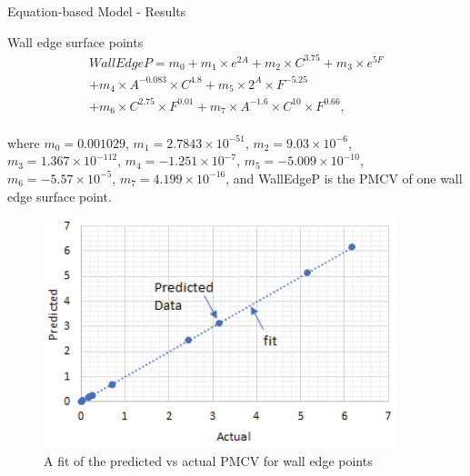 \documentclass{beamer}
\begin{document}
\begin{frame}{Equation-based Model - Results}
    \begin{block}{Wall edge surface points}
        \;\vspace{-5mm}\begin{multline}
            WallEdgeP = m_0 + m_1 \times e^{2A} + m_2 \times C^{3.75} + m_3 \times e^{5F}\\ + m_4 \times A^{-0.083} \times C^{4.8} + m_5 \times 2^{A} \times F^{-5.25}\\ + m_6 \times C^{2.75} \times F^{0.01} + m_7 \times A^{-1.6} \times C^{10} \times F^{0.66},
        \end{multline}\\\vspace{-3mm}\justifying
        where $m_0 = 0.001029$, $m_1 = 2.7843 \times 10^{-51}$, $m_2 = 9.03 \times 10^{-6}$, $m_3 = 1.367 \times 10^{-112}$, $m_4 = -1.251 \times 10^{-7}$, $m_5 = -5.009 \times 10^{-10}$, $m_6 = -5.57 \times 10^{-5}$, $m_7 = 4.199 \times 10^{-16}$, and WallEdgeP is the PMCV of one wall edge surface point.\vspace{-2mm}
        \begin{figure}
            \centering
            \includegraphics[width=0.3\columnwidth]{Figures/Eq-WE.png}\vspace{-1mm}
            \caption{A fit of the predicted vs actual PMCV for wall edge points}
        \end{figure}\vspace{-6.5mm}
    \end{block}
\end{frame}
\end{document}
